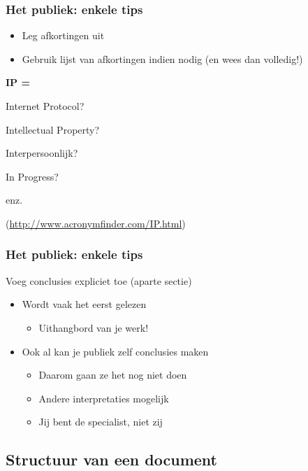 \documentclass[aspectratio=169]{beamer}
\begin{document}
\begin{frame}
  \frametitle{Het publiek: enkele tips}

  \begin{itemize}
    \item Leg afkortingen uit
    \item Gebruik lijst van afkortingen indien nodig (en wees dan volledig!)
  \end{itemize}

  \vfill \centering

  \textbf{IP =}

  Internet Protocol?

  Intellectual Property?

  Interpersoonlijk?

  In Progress?

  enz.

  (\url{http://www.acronymfinder.com/IP.html})

\end{frame}

\begin{frame}
  \frametitle{Het publiek: enkele tips}

  Voeg conclusies expliciet toe (aparte sectie)

  \begin{itemize}
    \item Wordt vaak het eerst gelezen
      \begin{itemize}
        \item Uithangbord van je werk!
      \end{itemize}
    \item Ook al kan je publiek zelf conclusies maken
      \begin{itemize}
        \item Daarom gaan ze het nog niet doen
        \item Andere interpretaties mogelijk
        \item Jij bent de specialist, niet zij
      \end{itemize}
  \end{itemize}
\end{frame}

\subsection{Structuur van een document}
\end{document}
